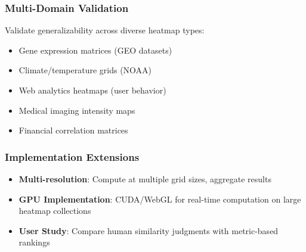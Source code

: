 \documentclass[11pt]{article}
\begin{document}
\subsubsection{Multi-Domain Validation}

Validate generalizability across diverse heatmap types:
\begin{itemize}
    \item Gene expression matrices (GEO datasets)
    \item Climate/temperature grids (NOAA)
    \item Web analytics heatmaps (user behavior)
    \item Medical imaging intensity maps
    \item Financial correlation matrices
\end{itemize}

\subsubsection{Implementation Extensions}
\begin{itemize}
    \item \textbf{Multi-resolution}: Compute at multiple grid sizes, aggregate results
    \item \textbf{GPU Implementation}: CUDA/WebGL for real-time computation on large heatmap collections
    \item \textbf{User Study}: Compare human similarity judgments with metric-based rankings
\end{itemize}
\end{document}
